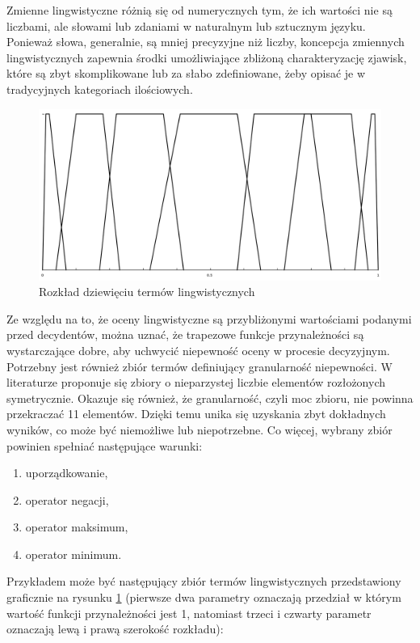Zmienne lingwistyczne różnią się od numerycznych tym, że ich wartości nie są
liczbami, ale słowami lub zdaniami w naturalnym lub sztucznym języku. Ponieważ
słowa, generalnie, są mniej precyzyjne niż liczby, koncepcja zmiennych
lingwistycznych zapewnia środki umożliwiające zbliżoną charakteryzację zjawisk,
które są zbyt skomplikowane lub za słabo zdefiniowane, żeby opisać je w
tradycyjnych kategoriach ilościowych.
\begin{figure}[ht]
  \includegraphics[width=\linewidth]
    {chapters/preferences/zbior_termow}
  \caption{Rozkład dziewięciu termów lingwistycznych}
  \label{fig:rozklad_dziewieciu_termow_lingwistycznych}
\end{figure}
Ze względu na to, że oceny lingwistyczne są przybliżonymi wartościami podanymi
przed decydentów, można uznać, że trapezowe funkcje przynależności są
wystarczające dobre, aby uchwycić niepewność oceny w procesie decyzyjnym.
Potrzebny jest również zbiór termów definiujący granularność niepewności. W
literaturze proponuje się zbiory o nieparzystej liczbie elementów rozłożonych
symetrycznie. Okazuje się również, że granularność, czyli moc zbioru, nie
powinna przekraczać 11 elementów. Dzięki temu unika się uzyskania zbyt
dokładnych wyników, co może być niemożliwe lub niepotrzebne. Co więcej, wybrany
zbiór powinien spełniać następujące warunki:
\begin{enumerate}[1)]
  \item uporządkowanie,
  \item operator negacji,
  \item operator maksimum,
  \item operator minimum.
\end{enumerate}

Przykładem może być następujący zbiór termów lingwistycznych przedstawiony
graficznie na rysunku \ref{fig:rozklad_dziewieciu_termow_lingwistycznych}
(pierwsze dwa parametry oznaczają przedział w którym wartość funkcji
przynależności jest 1, natomiast trzeci i czwarty parametr oznaczają lewą i
prawą szerokość rozkładu):

